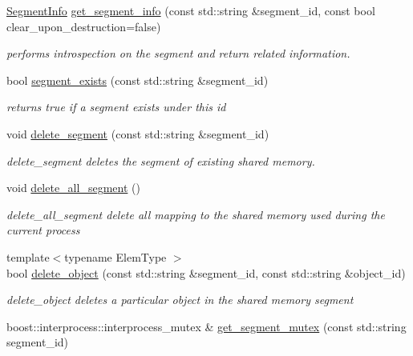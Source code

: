 \begin{DoxyCompactItemize}
\hyperlink{classshared__memory_1_1SegmentInfo}{Segment\+Info} \hyperlink{namespaceshared__memory_a70f7613a247615e323cab083934c803e}{get\+\_\+segment\+\_\+info} (const std\+::string \&segment\+\_\+id, const bool clear\+\_\+upon\+\_\+destruction=false)
\begin{DoxyCompactList}\small\item\em performs introspection on the segment and return related information. \end{DoxyCompactList}\item 
bool \hyperlink{namespaceshared__memory_a82297c2b7b85c57c53578749c9bd6429}{segment\+\_\+exists} (const std\+::string \&segment\+\_\+id)
\begin{DoxyCompactList}\small\item\em returns true if a segment exists under this id \end{DoxyCompactList}\item 
void \hyperlink{namespaceshared__memory_a60cbce63ae7fb64a2758b773f9006471}{delete\+\_\+segment} (const std\+::string \&segment\+\_\+id)
\begin{DoxyCompactList}\small\item\em delete\+\_\+segment deletes the segment of existing shared memory. \end{DoxyCompactList}\item 
\mbox{\label{namespaceshared__memory_a1f88dd41dca9a23387090866213dbd85}} 
void \hyperlink{namespaceshared__memory_a1f88dd41dca9a23387090866213dbd85}{delete\+\_\+all\+\_\+segment} ()
\begin{DoxyCompactList}\small\item\em delete\+\_\+all\+\_\+segment delete all mapping to the shared memory used during the current process \end{DoxyCompactList}\item 
{\footnotesize template$<$typename Elem\+Type $>$ }\\bool \hyperlink{namespaceshared__memory_a7b43b29fa0aa6a5cad0ca47afdd03e83}{delete\+\_\+object} (const std\+::string \&segment\+\_\+id, const std\+::string \&object\+\_\+id)
\begin{DoxyCompactList}\small\item\em delete\+\_\+object deletes a particular object in the shared memory segment \end{DoxyCompactList}\item 
boost\+::interprocess\+::interprocess\+\_\+mutex \& \hyperlink{namespaceshared__memory_aed33c9701140a1c43e40f182a380199b}{get\+\_\+segment\+\_\+mutex} (const std\+::string segment\+\_\+id)

\end{DoxyCompactItemize}
